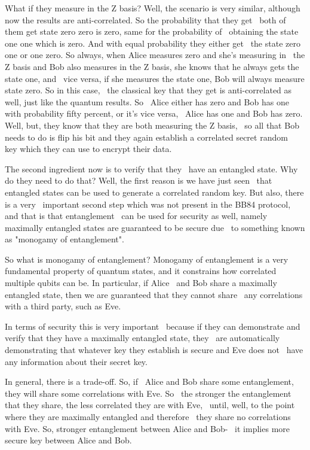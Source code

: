 What if they measure in the Z basis? Well,
the scenario is very similar, although 
now the results are anti-correlated.
So the probability that they get 
both of them get state zero zero
is zero, same for the probability of 
obtaining the state one one which is zero.
And with equal probability they either get 
the state zero one or one zero. So always,
when Alice measures zero and she's measuring in 
the Z basis and Bob also measures in the Z basis,
she knows that he always gets the state one, and 
vice versa, if she measures the state one, Bob
will always measure state zero. So in this case, 
the classical key that they get is anti-correlated
as well, just like the quantum results. So 
Alice either has zero and Bob has one with
probability fifty percent, or it's vice versa, 
Alice has one and Bob has zero. Well, but, they
know that they are both measuring the Z basis, 
so all that Bob needs to do is flip his bit and
they again establish a correlated secret random 
key which they can use to encrypt their data.

The second ingredient now is to verify that they 
have an entangled state. Why do they need to do
that? Well, the first reason is we have just seen 
that entangled states can be used to generate a
correlated random key. But also, there is a very 
important second step which was not present in
the BB84 protocol, and that is that entanglement 
can be used for security as well, namely maximally
entangled states are guaranteed to be secure due 
to something known as "monogamy of entanglement".

So what is monogamy of entanglement?
Monogamy of entanglement is a very 
fundamental property of quantum states,
and it constrains how correlated
multiple qubits can be. In particular, if Alice 
and Bob share a maximally entangled state,
then we are guaranteed that they cannot share 
any correlations with a third party, such as Eve.

In terms of security this is very important 
because if they can demonstrate and verify that
they have a maximally entangled state, they 
are automatically demonstrating that whatever
key they establish is secure and Eve does not 
have any information about their secret key.

In general, there is a trade-off. So, if 
Alice and Bob share some entanglement,
they will share some correlations with Eve. So 
the stronger the entanglement that they share,
the less correlated they are with Eve, 
until, well, to the point where they
are maximally entangled and therefore 
they share no correlations with Eve.
So, stronger entanglement between Alice and Bob- 
it implies more secure key between Alice and Bob.

